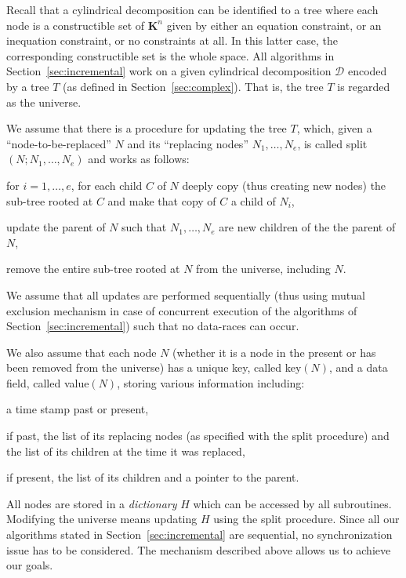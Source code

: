 \documentclass[10pt]{article}
\def\KK {\ensuremath{\mathbf{K}}}
\def\DD {\ensuremath{\mathcal{D}}}
\def\TT {\ensuremath{T}}
\begin{document}
Recall that a cylindrical decomposition can be identified to
a  tree 
where each node is a constructible set of ${\KK}^n$ given
by either an equation constraint, or an inequation
constraint, or no constraints at all.
In this latter case, the corresponding constructible
set is the whole space.
All algorithms in Section~\ref{sec:incremental}
work on a given cylindrical decomposition ${\DD}$
encoded by a tree ${\TT}$ (as defined in 
Section~\ref{sec:complex}).
That is, the tree $T$ is regarded as the universe.

We assume that there is a procedure for updating the 
tree ${\TT}$, which, given a ``node-to-be-replaced'' $N$ and 
its ``replacing nodes'' $N_1, \ldots, N_e$, 
is called {\sf split}$(N; N_1, \ldots, N_e)$ and 
works as follows:
\begin{enumerateshort}
\item for $i = 1, \ldots, e$,  for each child $C$ of $N$ deeply copy (thus 
      creating new nodes) the sub-tree rooted at $C$
      and make that copy of $C$ a child of $N_i$,
\item update the parent of $N$ such that $N_1, \ldots, N_e$
      are new children of the the parent of $N$,
\item remove the entire sub-tree rooted at $N$ from the universe, 
      including $N$.
\end{enumerateshort}
We assume that all updates are performed sequentially (thus using
mutual exclusion mechanism in case of concurrent execution
of the algorithms of Section~\ref{sec:incremental})
such that no data-races can occur.

We also assume that each node $N$  (whether it is a node 
in the present or has been removed from the universe)
has a unique key, called 
{\sf key}$(N)$, and a data field, called {\sf value}$(N)$,
storing various information including:
\begin{itemizeshort}
\item a time stamp {\sc past} or {\sc present},
\item if {\sc past}, the list of its replacing nodes (as specified
      with the {\sf split} procedure) and the list
      of its children at the time it was replaced,
\item if {\sc present}, the list of its  children and a pointer to the parent.
\end{itemizeshort}

All nodes are stored in a {\em dictionary} $H$
which can be accessed by all subroutines.
Modifying the universe means updating $H$
using the {\sf split} procedure.
Since all our algorithms stated in Section~\ref{sec:incremental} are sequential,
no synchronization issue has to be considered.
The mechanism described above allows us
to achieve our goals.
\end{document}
